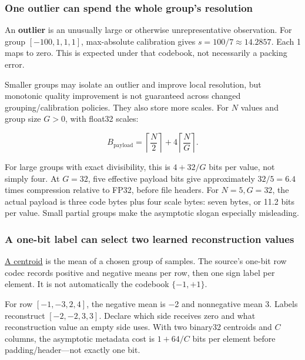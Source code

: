 \subsubsection{One outlier can spend the whole group's resolution}\label{01-foundations-i-ch001-one-outlier-can-spend-the-whole-groups-resolution}

\hypertarget{01-foundations-i-ch001-one-outlier-can-spend-the-whole-groups-resolution}{}

An \textbf{outlier} is an unusually large or otherwise unrepresentative observation. For group \([-100,1,1,1]\), max-absolute calibration gives \(s=100/7\approx14.2857\). Each 1 maps to zero. This is expected under that codebook, not necessarily a packing error.

Smaller groups may isolate an outlier and improve local resolution, but monotonic quality improvement is not guaranteed across changed grouping/calibration policies. They also store more scales. For \(N\) values and group size \(G>0\), with float32 scales:

\[
B_{\mathrm{payload}}=
\left\lceil\frac N2\right\rceil
+4\left\lceil\frac NG\right\rceil.
\]

For large groups with exact divisibility, this is \(4+32/G\) bits per value, not simply four. At \(G=32\), five effective payload bits give approximately \(32/5=6.4\) times compression relative to FP32, before file headers. For \(N=5,G=32\), the actual payload is three code bytes plus four scale bytes: seven bytes, or 11.2 bits per value. Small partial groups make the asymptotic slogan especially misleading.

\subsubsection{A one-bit label can select two learned reconstruction values}\label{01-foundations-i-ch001-a-one-bit-label-can-select-two-learned-reconstruction-values}

\hypertarget{01-foundations-i-ch001-a-one-bit-label-can-select-two-learned-reconstruction-values}{}

\hyperref[appendix-4ccd7a775813]{A centroid} is the mean of a chosen group of samples. The source's one-bit row codec records positive and negative means per row, then one sign label per element. It is not automatically the codebook \(\{-1,+1\}\).

For row \([-1,-3,2,4]\), the negative mean is −2 and nonnegative mean 3. Labels  reconstruct \([-2,-2,3,3]\). Declare which side receives zero and what reconstruction value an empty side uses. With two binary32 centroids and \(C\) columns, the asymptotic metadata cost is \(1+64/C\) bits per element before padding/header---not exactly one bit.

